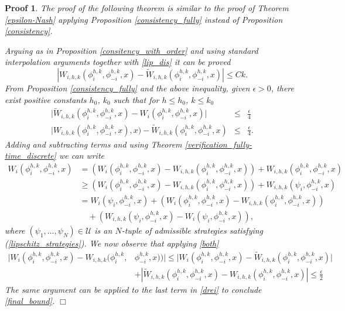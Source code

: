 \documentclass[12pt]{article}
\newtheorem{Proof}{Proof}
\newenvironment{proof}{\begin{Proof}\rm}{\hfill $\Box$ \end{Proof}}
\begin{document}
\begin{proof}
The proof of the following theorem is similar to the proof of Theorem  \ref{epsilon-Nash} applying
Proposition \ref{consistency_fully} instead of Proposition \ref{consistency}.

Arguing as in Proposition \ref{consitency_with_order} and using standard interpolation arguments together
with \eqref{lip_dis} it can be proved
\begin{equation}\label{con_29}
|W_{i,h,k}(\phi_{i}^{h,k},\phi_{-i}^{h,k},x)
-\widetilde W_{i,h,k}(\phi_{i}^{h,k},\phi_{-i}^{h,k},x)|\le Ck.
\end{equation}
From Proposition \ref{consistency_fully} and the above inequality,  given $\epsilon>0$, there exist positive constants $h_0$, $k_0$ such that for $h\le h_0$, $k\le k_0$
\begin{eqnarray}\label{both}
\bigl|\widetilde W_{i,h,k}(\phi_{i}^{h,k},\phi_{-i}^{h,k},x)-W_i(\phi_i^{h,k},\phi_{-i}^{h,k},x)\bigr|&\le& \frac{\epsilon}{4}\nonumber\\
|W_{i,h,k}(\phi_{i}^{h,k},\phi_{-i}^{h,k},x),x)
-\widetilde W_{i,h,k}(\phi_{i}^{h,k},\phi_{-i}^{h,k},x)&\le&\frac{\epsilon}{4}.
\end{eqnarray}
Adding and subtracting terms and using Theorem \ref{verification_fully-time_discrete} we can write
\begin{align}\label{drei}
W_i(\phi_i^{h,k},\phi_{-i}^{h,k},x)&=(W_i(\phi_i^{h,k},\phi_{-i}^{h,k},x)-W_{i,h,k}(\phi_i^{h,k},\phi_{-i}^{h,k},x))+W_{i,h,k}(\phi_i^{h,k},\phi_{-i}^{h,k},x)\nonumber\\
&\ge(W_i(\phi_i^{h,k},\phi_{-i}^{h,k},x)-W_{i,h,k}(\phi_i^{h,k},\phi_{-i}^{h,k},x))+W_{i,h,k}(\psi_i,\phi_{-i}^{h,k},x)\nonumber\\
&=W_i(\psi_i,\phi_{-i}^{h,k},x)+(W_i(\phi_i^{h,k},\phi_{-i}^{h,k},x)-W_{i,h,k}(\phi_i^{h,k},\phi_{-i}^{h,k},x))\nonumber\\
&\quad +(W_{i,h,k}(\psi_i,\phi_{-i}^{h,k},x)-W_i(\psi_i,\phi_{-i}^{h,k},x)),
\end{align}
where $(\psi_1,\dots,\psi_N)\in\mathcal{U}$ is an $N$-tuple of admissible strategies satisfying (\ref{lipschitz_strategies}).
We now observe that applying \eqref{both}
\begin{align*}
|W_i(\phi_i^{h,k},\phi_{-i}^{h,k},x)-W_{i,h,k}(\phi_i^{h,k},&\phi_{-i}^{h,k},x))|\le
|W_{i}(\phi_i^{h,k},\phi_{-i}^{h,k},x)-\widetilde W_{i,h,k}(\phi_i^{h,k},\phi_{-i}^{h,k},x)|
\\
&+|\widetilde W_{i,h,k}(\phi_i^{h,k},\phi_{-i}^{h,k},x)-W_{i,h,k}(\phi_i^{h,k},\phi_{-i}^{h,k},x)|\le \frac{\epsilon}{2}
\end{align*}
The same argument can be applied to the last term in \eqref{drei} to conclude \eqref{final_bound}.
\end{proof}
\end{document}
